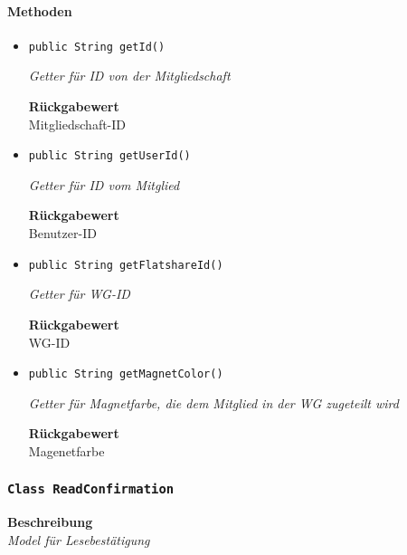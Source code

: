    \paragraph*{Methoden}
    \begin{itemize}
    	\item{\texttt{public String getId()}}
    	
    	\textit{Getter für ID von der Mitgliedschaft}
    	
    	
    	
    	\textbf{Rückgabewert} \\
    	Mitgliedschaft-ID        \item{\texttt{public String getUserId()}}
    	
    	\textit{Getter für ID vom Mitglied}
    	
    	
    	
    	\textbf{Rückgabewert} \\
    	Benutzer-ID        \item{\texttt{public String getFlatshareId()}}
    	
    	\textit{Getter für WG-ID}
    	
    	
    	
    	\textbf{Rückgabewert} \\
    	WG-ID        \item{\texttt{public String getMagnetColor()}}
    	
    	\textit{Getter für Magnetfarbe, die dem Mitglied in der WG zugeteilt wird}
    	
    	
    	
    	\textbf{Rückgabewert} \\
    	Magenetfarbe
    \end{itemize}
    \subsubsection{\texttt{Class ReadConfirmation}}
    \textbf{Beschreibung} \\
    \textit{Model für Lesebestätigung}
